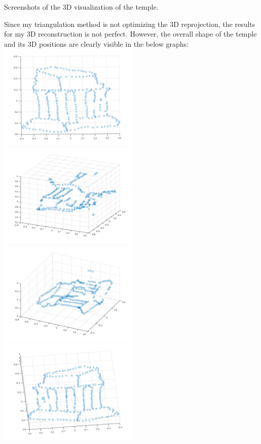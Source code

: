 \documentclass[12pt,letterpaper,boxed]{hmcpset}
\begin{document}
\begin{problem}[2.7]
Screenshots of the 3D visualization of the temple.
\end{problem}
\begin{solution}
Since my triangulation method is not optimizing the 3D reprojection,
the results for my 3D reconstruction is not perfect. However, the overall
shape of the temple and its 3D positions are clearly visible in the below graphs:\\
\includegraphics[width=0.5\textwidth]{q2_7_1.png}
\includegraphics[width=0.5\textwidth]{q2_7_2.png}\\
\includegraphics[width=0.5\textwidth]{q2_7_3.png}
\includegraphics[width=0.5\textwidth]{q2_7_4.png}

\end{solution}
\end{document}
